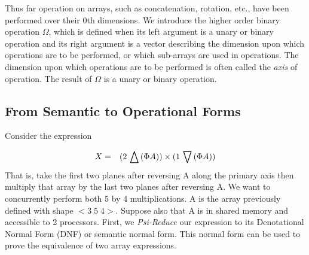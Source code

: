 Thus far operation on arrays, such as concatenation, rotation, etc., have been 
performed over their 0th dimensions.  We introduce the higher order binary 
operation $\Omega$, which is defined when its left argument is a unary or binary
operation and its right argument is a vector describing the dimension upon 
which operations are to be performed, or which sub-arrays are used in 
operations.  The dimension upon which operations are to be performed is often 
called the {\it axis} of operation.  The result of $\Omega$ is a unary or 
binary operation.

\subsection*{From Semantic to Operational Forms}


Consider the expression

\begin{eqnarray}
X & = & (2 \,\bigtriangleup\, ( \Phi A)) \times ( 1 \,\bigtriangledown\, (\Phi A)) 
\end{eqnarray}
That is, take the first two planes after reversing A along the primary axis then multiply that array by the last two 
planes after reversing A. We want to concurrently perform both 5 by 4 multiplications. 
A is the array previously defined with shape $<3\;5\;4>$.
Suppose also that A is in shared memory and accessible to 2 processors.
First, we {\em Psi-Reduce} our expression to its Denotational Normal Form (DNF) or semantic 
normal form. This normal form can be used to prove the equivalence of  two array expressions.

